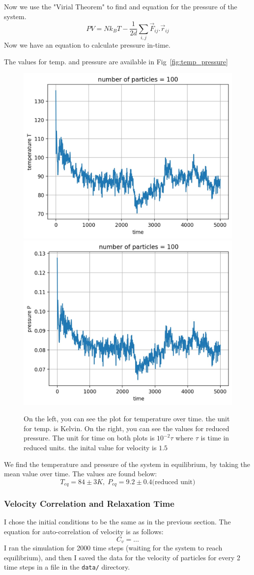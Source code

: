\documentclass[12pt, a4paper]{article}
\begin{document}
	Now we use the "Virial Theorem" to find and equation for the pressure of the system.
	\begin{equation}
		P V = N k_B T - \frac{1}{2d} \sum_{i,j} \vec{F}_{ij}.\vec{r}_{ij}
	\end{equation}
	 Now we have an equation to calculate pressure in-time. 
	 
	 The values for temp. and pressure are available in Fig~\ref{fig:temp_pressure}
	 
	 \begin{figure}[h!]
		\centering
		\includegraphics[width=.45\linewidth]{../results/temp100_5000.jpg}
		\includegraphics[width=.45\linewidth]{../results/pressure100_5000.jpg}
		\caption{On the left, you can see the plot for temperature over time. the unit for temp. is Kelvin. On the right, you can see the values for 
		reduced pressure. The unit for time on both plots is $10^{-2} \tau$ where $\tau$ is time in reduced units.
		the inital value for velocity is $1.5$}
	 \end{figure}
 
 	We find the temperature and pressure of the system in equilibrium, by taking the mean value over time. The values are found below:
 	\begin{equation*}
 		T_{eq} = 84 \pm 3 K, \; P_{eq} = 9.2 \pm 0.4 \text{(reduced unit)}
 	\end{equation*}
	
	\subsubsection{Velocity Correlation and Relaxation Time}
	I chose the initial conditions to be the same as in the previous section. The equation for auto-correlation of 
	velocity is as follows:
	\begin{equation}
		C_v = \dots
	\end{equation}
	I ran the simulation for 2000 time steps (waiting for the system to reach equilibrium), and then I saved the
	data for the velocity of particles for every 2 time steps in a file in the \texttt{data/} directory.
	
\end{document}
